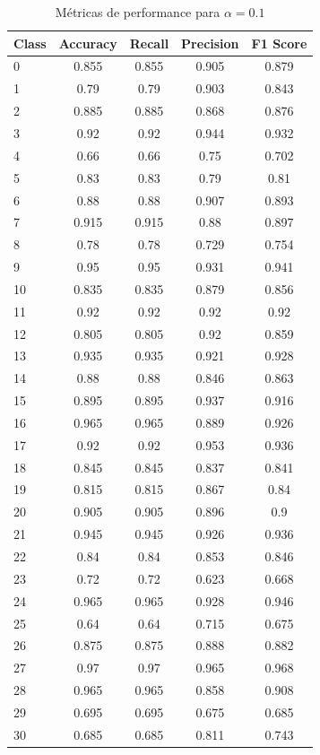 \begin{table}[!t]
\caption{Métricas de performance para $\alpha = 0.1$}
\begin{center}
\begin{tabular}{l c c c c}
Class & Accuracy & Recall & Precision & F1 Score\\ \hline
0 & 0.855 & 0.855 & 0.905 & 0.879\\
1 & 0.79 & 0.79 & 0.903 & 0.843\\
2 & 0.885 & 0.885 & 0.868 & 0.876\\
3 & 0.92 & 0.92 & 0.944 & 0.932\\
4 & 0.66 & 0.66 & 0.75 & 0.702\\
5 & 0.83 & 0.83 & 0.79 & 0.81\\
6 & 0.88 & 0.88 & 0.907 & 0.893\\
7 & 0.915 & 0.915 & 0.88 & 0.897\\
8 & 0.78 & 0.78 & 0.729 & 0.754\\
9 & 0.95 & 0.95 & 0.931 & 0.941\\
10 & 0.835 & 0.835 & 0.879 & 0.856\\
11 & 0.92 & 0.92 & 0.92 & 0.92\\
12 & 0.805 & 0.805 & 0.92 & 0.859\\
13 & 0.935 & 0.935 & 0.921 & 0.928\\
14 & 0.88 & 0.88 & 0.846 & 0.863\\
15 & 0.895 & 0.895 & 0.937 & 0.916\\
16 & 0.965 & 0.965 & 0.889 & 0.926\\
17 & 0.92 & 0.92 & 0.953 & 0.936\\
18 & 0.845 & 0.845 & 0.837 & 0.841\\
19 & 0.815 & 0.815 & 0.867 & 0.84\\
20 & 0.905 & 0.905 & 0.896 & 0.9\\
21 & 0.945 & 0.945 & 0.926 & 0.936\\
22 & 0.84 & 0.84 & 0.853 & 0.846\\
23 & 0.72 & 0.72 & 0.623 & 0.668\\
24 & 0.965 & 0.965 & 0.928 & 0.946\\
25 & 0.64 & 0.64 & 0.715 & 0.675\\
26 & 0.875 & 0.875 & 0.888 & 0.882\\
27 & 0.97 & 0.97 & 0.965 & 0.968\\
28 & 0.965 & 0.965 & 0.858 & 0.908\\
29 & 0.695 & 0.695 & 0.675 & 0.685\\
30 & 0.685 & 0.685 & 0.811 & 0.743\\

\end{tabular}
\end{center}
\end{table}
